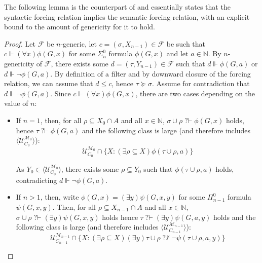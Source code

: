 \documentclass{article}
\def\NN{\mathbb{N}}
\def\MM{\mathbb{M}}
\def\F{\mathcal{F}}
\def\U{\mathcal{U}}
\def\M{\mathcal{M}}
\newcommand{\qvdash}{\operatorname{{?}{\vdash}}}
\newcommand{\nqvdash}{\operatorname{{?}{\nvdash}}}
\numberwithin{theorem}{section}
\newtheorem{proposition}[theorem]{Proposition}
\theoremstyle{definition}
\begin{document}
The following lemma is the counterpart of  and essentially states that the syntactic forcing relation implies the semantic forcing relation, with an explicit bound to the amount of genericity for it to hold.


\begin{proof}
Let $\F$ be $n$-generic, let $c = (\sigma, X_{n-1}) \in \F$ be such that $c \Vdash (\forall x) \phi(G,x)$ for some $\Sigma_n^0$ formula $\phi(G,x)$ and let $a \in \NN$. By $n$-genericity of $\F$, there exists some $d = (\tau,Y_{n-1}) \in \F$ such that $d \Vdash \phi(G,a)$ or $d \Vdash \neg \phi(G,a)$. By definition of a filter and by downward closure of the forcing relation, we can assume that $d \leq c$, hence $\tau \succeq \sigma$. Assume for contradiction that $d \Vdash \neg \phi(G,a)$. Since $c \Vdash (\forall x)\phi(G,x)$, there are two cases depending on the value of $n$:
\begin{itemize}
    \item If $n = 1$, then, for all $\rho \subseteq X_0 \cap A$ and all $x \in \NN$, $\sigma \cup \rho \qvdash \phi(G,x)$ holds, hence $\tau \qvdash \phi(G,a)$ and the following class is large (and therefore includes $\langle \U_{C_0}^{\M_0} \rangle$):
$$\U_{C_{0}}^{\M_{0}} \cap \{X : (\exists \rho \subseteq X )\phi(\tau \cup \rho, a) \}$$
    
    As $Y_0 \in \langle \U_{C_0}^{\M_0} \rangle$, there exists some $\rho \subseteq Y_0$ such that $\phi(\tau \cup \rho, a)$ holds, contradicting $d \Vdash \neg \phi(G,a)$. %
    
    \item If $n > 1$, then, write $\phi(G,x) = (\exists y)\psi(G,x,y)$ for some $\Pi_{n-1}^0$ formula $\psi(G,x,y)$. Then, for all $\rho \subseteq X_{n-1} \cap A$ and all $x \in \NN$, $\sigma \cup \rho \qvdash (\exists y)\psi(G,x,y)$ holds hence $\tau \qvdash (\exists y) \psi(G,a,y)$ holds and the following class is large (and therefore includes $\langle \U_{C_{n-1}}^{\M_{n-1}} \rangle$):
$$\U_{C_{n-1}}^{\M_{n-1}} \cap \{X : (\exists \rho \subseteq X)(\exists y) \tau \cup \rho \nqvdash \neg \psi(\tau \cup \rho, a,y) \}$$


\end{itemize}
\end{proof}
\end{document}
